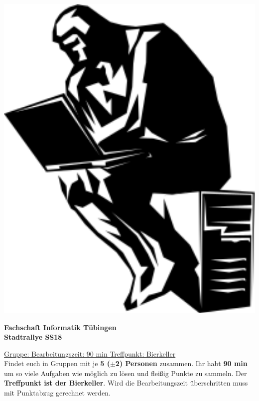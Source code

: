 \documentclass[11pt,paper=a4,answers]{exam}
\begin{document}
	
\noindent
\begin{minipage}[l]{.1\textwidth}
\noindent
\includegraphics[width=1.5\textwidth]{graphics/denker}
\end{minipage}
\begin{minipage}[r]{.8\textwidth}
\begin{center}
{\large \bfseries Fachschaft Informatik Tübingen \\
\Large Stadtrallye SS18 \par}
\end{center}
\end{minipage}
\par
\vspace{0.5cm}
\noindent
\uline{Gruppe:\hspace{2cm} \hfill Bearbeitungszeit: 90 min   \hfill     Treffpunkt: Bierkeller}
\vspace{0.5cm}\\
Findet euch in Gruppen mit je \textbf{5 ($\pm$2) Personen} zusammen. Ihr habt \textbf{90 min} um so viele Aufgaben wie möglich zu lösen und fleißig Punkte zu sammeln. Der \textbf{Treffpunkt ist der Bierkeller}. Wird die Bearbeitungszeit überschritten muss mit Punktabzug gerechnet werden.
\end{document}
